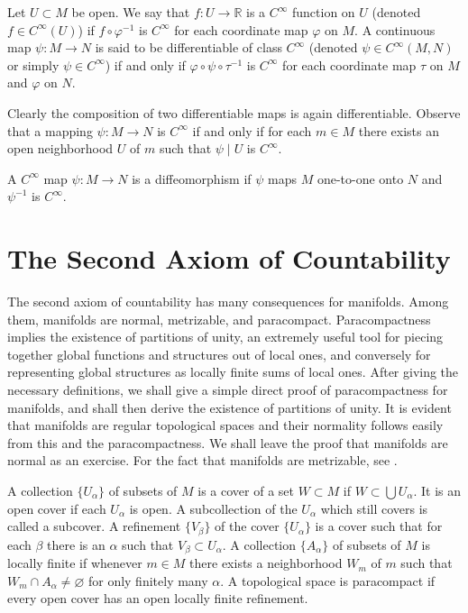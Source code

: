 \begin{definition}\label{thm:1.6}
	Let $U \subset M$ be open. We say that $f: U \to \mathbb{R}$ is a $C^\infty$ function on
	$U$ (denoted $f \in C^\infty(U)$) if $f \circ \varphi^{-1}$ is $C^\infty$
	for each coordinate map $\varphi$ on $M$. A continuous map
	$\psi: M \to N$ is said to be differentiable of class $C^\infty$
	(denoted $\psi \in C^\infty(M,N)$ or simply $\psi \in C^\infty$)
	if and
	only if $\varphi \circ \psi \circ \tau^{-1}$ is $C^\infty$
	for each coordinate map $\tau$ on $M$ and $\varphi$ on $N$.
\end{definition}

Clearly the composition of two differentiable maps
is again differentiable. Observe that a mapping $\psi: M \to N$ is $C^\infty$
if and only if for each $m \in M$ there exists an open
neighborhood $U$ of $m$ such that $\psi \mid U$ is $C^\infty$.


\begin{definition}[Diffeomorphism]\label{def:diffeo}
	A $C^\infty$ map $\psi: M\to N$ is a diffeomorphism if
	$\psi$ maps $M$ one-to-one onto $N$ and $\psi^{-1}$ is $C^\infty$. 
\end{definition}


\section{The Second Axiom of Countability}


The second axiom of countability has many consequences
for manifolds. Among them, manifolds are normal, metrizable,
and paracompact. Paracompactness implies the existence of
partitions of unity, an extremely useful tool for piecing
together global functions and structures out of local ones,
and conversely for representing global structures as locally
finite sums of local ones. After giving the necessary
definitions, we shall give a simple direct proof of
paracompactness for manifolds, and shall then derive the
existence of partitions of unity. It is evident that manifolds
are regular topological spaces and their normality follows easily
from this and the paracompactness. We shall leave the proof that
manifolds are normal as an exercise. For the fact that manifolds
are metrizable, see \cite{13}. 

\begin{definition}\label{thm:1.7}
	A collection $\{U_\alpha\}$ of subsets of $M$ is a cover of
	a set $W \subset M$ if $W \subset \bigcup U_\alpha$. It is an
	open cover if each $U_\alpha$ is open. A subcollection of the
	$U_\alpha$ which still covers is called a subcover.
	A refinement $\{V_\beta\}$ of the cover $\{U_\alpha\}$ is a
	cover such that for each $\beta$ there is an $\alpha$ such
	that $V_\beta \subset U_\alpha$. A collection $\{A_\alpha\}$ of
	subsets of $M$ is locally finite if whenever $m \in M$ there
	exists a neighborhood $W_m$ of $m$ such that $W_m \cap A_\alpha \neq \varnothing$
	for only finitely many $\alpha$.
	A topological space is paracompact if every open cover has an
	open locally finite refinement.
\end{definition}

